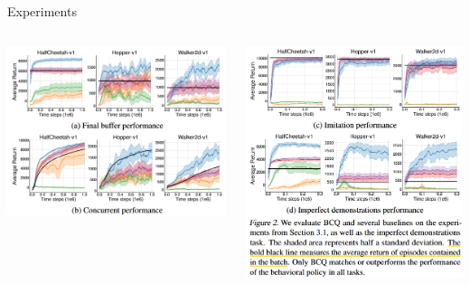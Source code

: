 \documentclass[11pt]{beamer}
\begin{document}
\begin{frame}{Experiments}
    \begin{columns}
        \begin{column}{0.45\textwidth}
            \includegraphics[width=1.0\textwidth]{figure2-1.png}
        \end{column}
        \begin{column}{0.45\textwidth}
            \includegraphics[width=1.0\textwidth]{figure2-2.png}
        \end{column}
    \end{columns}


\end{frame}
\end{document}
